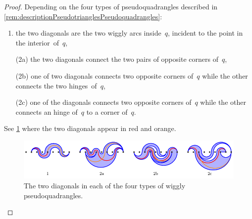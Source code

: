 \documentclass{amsart}
\theoremstyle{definition}
\begin{document}
\begin{proof}
Depending on the four types of pseudoquadrangles described in \cref{rem:descriptionPseudotrianglesPseudoquadrangles}:
\begin{enumerate}
\item the two diagonals are the two wiggly arcs inside~$q$, incident to the point in the interior~of~$q$,
\item[(2a)] the two diagonals connect the two pairs of opposite corners of~$q$,
\item[(2b)] one of two diagonals connects two opposite corners of~$q$ while the other connects the two hinges~of~$q$,
\item[(2c)] one of the diagonals connects two opposite corners of~$q$ while the other connects an hinge of~$q$ to a corner of~$q$.
\end{enumerate}
See \cref{fig:diagonalsPseudoquadrangles} where the two diagonals appear in red and orange.
%
\begin{figure}[h]
\centerline{\includegraphics[scale=1.3]{diagonalsPseudoquadrangles}}
\caption{The two diagonals in each of the four types of wiggly pseudoquadrangles.} %
\label{fig:diagonalsPseudoquadrangles}
\end{figure}
\end{proof}
\end{document}
